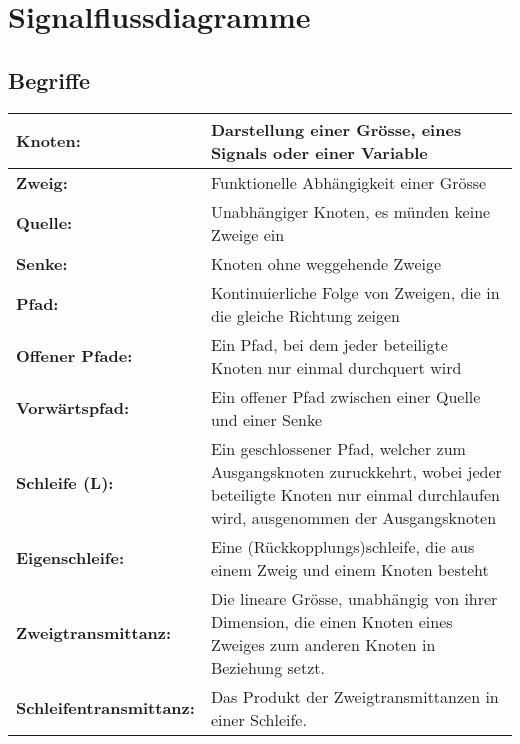 
\section{Signalflussdiagramme}
\subsection{Begriffe}
\begin{tabular}{|p{}|p{}|}
\hline
\textbf{Knoten:} &
Darstellung einer Grösse, eines Signals oder einer Variable
\\
\hline
\textbf{Zweig:} &
Funktionelle Abhängigkeit einer Grösse
\\
\hline
\textbf{Quelle:} &
Unabhängiger Knoten, es münden keine Zweige ein  
\\
\hline
\textbf{Senke:} &
Knoten ohne weggehende Zweige
\\
\hline
\textbf{Pfad:} &
Kontinuierliche Folge von Zweigen, die in die gleiche Richtung zeigen
\\
\hline
\textbf{Offener Pfade:} &
Ein Pfad, bei dem jeder beteiligte Knoten nur einmal durchquert wird
\\
\hline
\textbf{Vorwärtspfad:} &
Ein offener Pfad zwischen einer Quelle und einer Senke
\\
\hline
\textbf{Schleife (L):} &
Ein geschlossener Pfad, welcher zum Ausgangsknoten zuruckkehrt, wobei jeder beteiligte
Knoten nur einmal durchlaufen wird, ausgenommen der Ausgangsknoten
\\
\hline
\textbf{Eigenschleife:} & 
Eine (Rückkopplungs)schleife, die aus einem Zweig und einem Knoten besteht 
\\
\hline
\textbf{Zweigtransmittanz:} &
Die lineare Grösse, unabhängig von ihrer Dimension, die einen Knoten eines Zweiges zum
anderen Knoten in Beziehung setzt.
\\
\hline
\textbf{Schleifentransmittanz:} &
Das Produkt der Zweigtransmittanzen in einer Schleife.
\\
\hline
\end{tabular}
